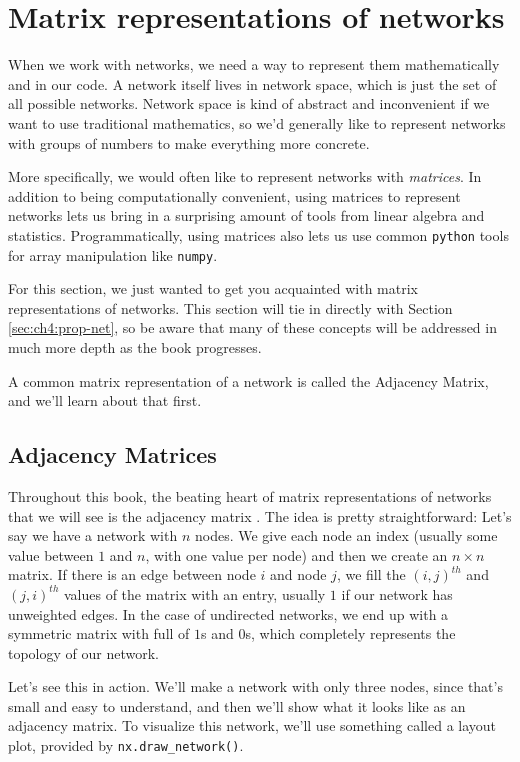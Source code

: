 \section{Matrix representations of networks}
\label{sec:ch4:mtx-rep}

When we work with networks, we need a way to represent them mathematically and in our code. A network itself lives in network space, which is just the set of all possible networks. Network space is kind of abstract and inconvenient if we want to use traditional mathematics, so we'd generally like to represent networks with groups of numbers to make everything more concrete.

More specifically, we would often like to represent networks with \emph{matrices}. In addition to being computationally convenient, using matrices to represent networks lets us bring in a surprising amount of tools from linear algebra and statistics. Programmatically, using matrices also lets us use common \texttt{python} tools for array manipulation like \texttt{numpy}.

For this section, we just wanted to get you acquainted with matrix representations of networks. This section will tie in directly with Section \ref{sec:ch4:prop-net}, so be aware that many of these concepts will be addressed in much more depth as the book progresses.

A common matrix representation of a network is called the Adjacency Matrix, and we'll learn about that first.

\subsection{Adjacency Matrices}

Throughout this book, the beating heart of matrix representations of networks that we will see is the adjacency matrix \cite{Godsil}. The idea is pretty straightforward: Let's say we have a network with $n$ nodes. We give each node an index (usually some value between $1$ and $n$, with one value per node) and then we create an $n \times n$ matrix. If there is an edge between node $i$ and node $j$, we fill the $(i, j)^{th}$ and $(j, i)^{th}$ values of the matrix with an entry, usually $1$ if our network has unweighted edges. In the case of undirected networks, we end up with a symmetric matrix with full of $1$s and $0$s, which completely represents the topology of our network.

Let's see this in action. We'll make a network with only three nodes, since that's small and easy to understand, and then we'll show what it looks like as an adjacency matrix. To visualize this network, we'll use something called a layout plot, provided by \texttt{nx.draw\_network()}.

